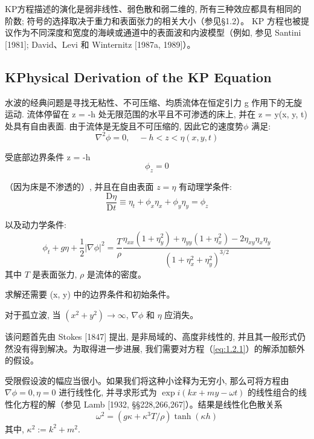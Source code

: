 \documentclass[14pt,a4paper,oneside]{article}
\numberwithin{equation}{subsection}             %
\begin{document}
KP方程描述的演化是弱非线性、弱色散和弱二维的, 所有三种效应都具有相同的阶数; 符号的选择取决于重力和表面张力的相关大小（参见§1.2）。 KP 方程也被提议作为不同深度和宽度的海峡或通道中的表面波和内波模型（例如, 参见 Santini [1981]; David、Levi 和 Winternitz [1987a, 1989]）。


\subsection{KPhysical Derivation of the KP Equation}

水波的经典问题是寻找无粘性、不可压缩、均质流体在恒定引力 g 作用下的无旋运动. 流体停留在 z = -h 处无限范围的水平且不可渗透的床上, 并在 z = y(x, y, t) 处具有自由表面. 由于流体是无旋且不可压缩的, 因此它的速度势$\phi$ 满足:
\begin{equation}
    \nabla^2\phi=0,\quad-h<z<\eta(x,y,t)
    \label{eq:1.2.1}
\end{equation}

受底部边界条件 z = -h
\begin{equation}
    \phi_{z}=0
    \label{eq:1.2.2}
\end{equation}

（因为床是不渗透的）, 并且在自由表面 $z=\eta$ 有动理学条件:
\begin{equation}
    \frac{\mathrm{D}\eta}{\mathrm{D}t}\equiv\eta_t+\phi_x\eta_x+\phi_y\eta_y=\phi_z
    \label{eq:1.2.3}
\end{equation}

以及动力学条件:
\begin{equation}
    \phi_t+g\eta+\frac12|\nabla\phi|^2=\frac T\rho\frac{\eta_{xx}(1+\eta_y^2)+\eta_{yy}(1+\eta_x^2)-2\eta_{xy}\eta_x\eta_y}{(1+\eta_x^2+\eta_y^2)^{3/2}}
    \label{eq:1.2.4}
\end{equation}
其中 $T$ 是表面张力, $\rho$ 是流体的密度。

求解还需要 (x, y) 中的边界条件和初始条件。

对于孤立波, 当 $(x^2 + y^2) \rightarrow  \infty$, $\nabla \phi$ 和 $\eta$ 应消失。 

该问题首先由 Stokes [1847] 提出, 是非局域的、高度非线性的, 并且其一般形式仍然没有得到解决。为取得进一步进展, 我们需要对方程（\ref{eq:1.2.1}）的解添加额外的假设。

受限假设波的幅应当很小。如果我们将这种小诠释为无穷小, 那么可将方程由 $\nabla \phi  = 0, \eta = 0$ 进行线性化, 并寻求形式为 $\exp{i(kx + my - \omega t) }$ 的线性组合的线性化方程的解（参见 Lamb [1932, §§228,266,267]）。结果是线性化色散关系
\begin{equation}
    \omega^2=(g\kappa+\kappa^3T/\rho)\tanh(\kappa h)
    \label{eq:1.2.5}
\end{equation}
其中, $\kappa^2:=k^2+m^2$.
\end{document}
